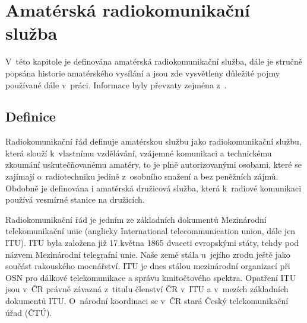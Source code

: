 
\chapter{Amatérská radiokomunikační služba}
\label{radioamateri}

V~této kapitole je definována amatérská radiokomunikační služba, dále je stručně popsána historie amatérského vysílání a jsou zde vysvětleny důležité pojmy používané dále v~práci. Informace byly převzaty zejména z~\cite{crk_hist}.

\section{Definice}
\label{radioamateri_def}

Radiokomunikační řád definuje amatérskou službu jako
radiokomunikační službu, která slouží k~vlastnímu vzdělávání, vzájemné
komunikaci a technickému zkoumání uskutečňovanému amatéry, to je plně
autorizovanými osobami, které se zajímají o~radiotechniku jedině z~osobního
snažení a bez peněžních zájmů. Obdobně je definována i amatérská družicová
služba, která k~radiové komunikaci používá vesmírné stanice na družicích.

Radiokomunikační řád je jedním ze základních dokumentů Mezinárodní
telekomunikační unie (anglicky International telecommunication union, dále jen
ITU). %
ITU byla založena již 17.května 1865 dvaceti evropskými státy, tehdy pod názvem Mezinárodní telegrafní
unie. Naše země stála u~jejího zrodu ještě jako součást rakouského mocnářství. ITU
je dnes stálou mezinárodní organizací při OSN pro dálkové telekomunikace a
správu kmitočtového spektra.
Opatření ITU jsou v~ČR právně závazná z~titulu členství ČR v~ITU a
v~mezích základních dokumentů ITU. O~národní koordinaci se v~ČR stará
Český telekomunikační úřad (ČTÚ). %

